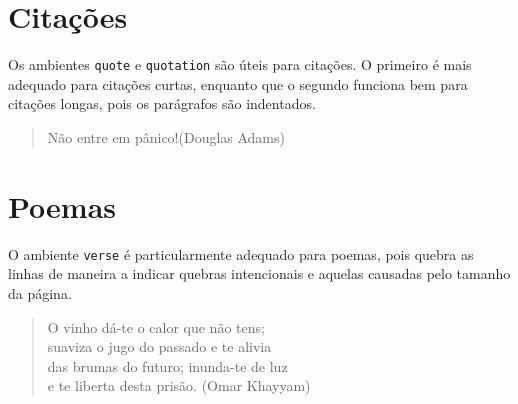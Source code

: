\documentclass[a4paper,oneside]{article}
\begin{document}
\frenchspacing

\section{Citações}

Os ambientes \texttt{quote} e \texttt{quotation} são úteis para citações. O
primeiro é mais adequado para citações curtas, enquanto que o segundo funciona
bem para citações longas, pois os parágrafos são indentados.

\begin{quote}
  Não entre em pânico!\hfill (Douglas Adams)
\end{quote}

\section{Poemas}

O ambiente \texttt{verse} é particularmente adequado para poemas, pois quebra
as linhas de maneira a indicar quebras intencionais e aquelas causadas pelo
tamanho da página.

\begin{verse}
  O vinho dá-te o calor que não tens;\\
  suaviza o jugo do passado e te alivia\\
  das brumas do futuro; inunda-te de luz\\
  e te liberta desta prisão.
  \flushright
  (Omar Khayyam)
\end{verse}
\end{document}
